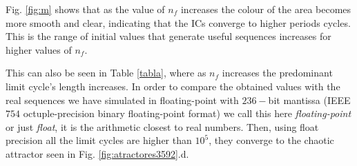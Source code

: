 Fig. \ref{fig:m} shows that as the value of $n_f$ increases the colour of the area becomes more smooth and clear, indicating that the ICs converge to
higher periods cycles. This is the range of initial values
that generate useful sequences increases for higher values of $n_f$.

This can also be seen in Table \ref{tabla}, where as $n_f$ increases the predominant limit cycle's length increases. In order to compare the obtained values with the real sequences we have simulated in floating-point with $236-$bit mantissa (IEEE $754$ octuple-precision binary floating-point format) we call this here \textit{floating-point} or just \textit{float}, it is the arithmetic closest to real numbers. Then, using float precision all the limit cycles are higher than $10^5$, they converge to the chaotic attractor seen in Fig. \ref{fig:atractores3592}.d.

